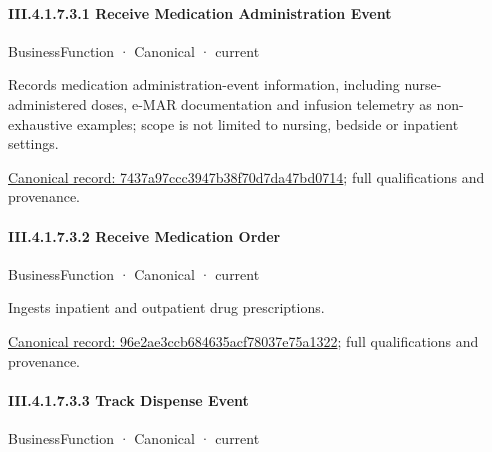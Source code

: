 \paragraph*{III.4.1.7.3.1 Receive Medication Administration Event}
\label{navigation:III.4.1.7.3.1}

\label{element:7437a97ccc3947b38f70d7da47bd0714}
{\small BusinessFunction · Canonical · current}\par

Records medication administration-event information, including nurse-administered doses, e-MAR documentation and infusion telemetry as non-exhaustive examples; scope is not limited to nursing, bedside or inpatient settings.


{\footnotesize \href{../../../../../../../continuum/business/business-function/7437a97ccc3947b38f70d7da47bd0714.md}{Canonical record: 7437a97ccc3947b38f70d7da47bd0714}; full qualifications and provenance.}\par
\paragraph*{III.4.1.7.3.2 Receive Medication Order}
\label{navigation:III.4.1.7.3.2}

\label{element:96e2ae3ccb684635acf78037e75a1322}
{\small BusinessFunction · Canonical · current}\par

Ingests inpatient and outpatient drug prescriptions.


{\footnotesize \href{../../../../../../../continuum/business/business-function/96e2ae3ccb684635acf78037e75a1322.md}{Canonical record: 96e2ae3ccb684635acf78037e75a1322}; full qualifications and provenance.}\par
\paragraph*{III.4.1.7.3.3 Track Dispense Event}
\label{navigation:III.4.1.7.3.3}

\label{element:e4c3b7e257b3448aa79d66992e9e9bbc}
{\small BusinessFunction · Canonical · current}\par

